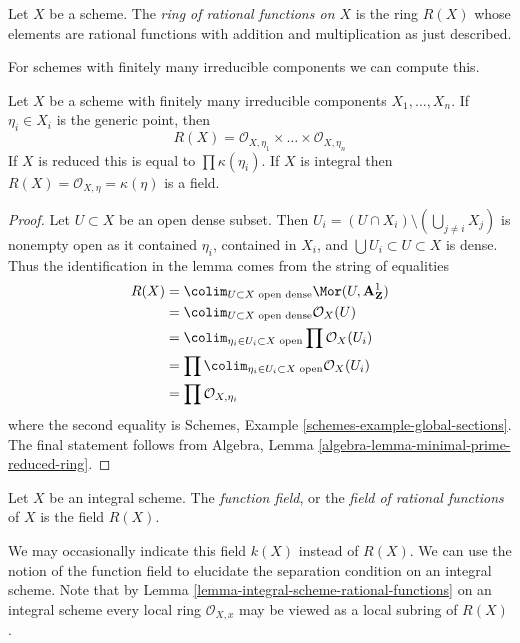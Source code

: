 \begin{definition}
\label{definition-ring-of-rational-functions}
Let $X$ be a scheme. The {\it ring of rational functions on $X$}
is the ring $R(X)$ whose elements are rational functions with
addition and multiplication as just described.
\end{definition}

\noindent
For schemes with finitely many irreducible components we can compute this.

\begin{lemma}
\label{lemma-integral-scheme-rational-functions}
Let $X$ be a scheme with finitely many irreducible components
$X_1, \ldots, X_n$. If $\eta_i \in X_i$ is the generic point, then
$$
R(X) = \mathcal{O}_{X, \eta_1} \times \ldots \times \mathcal{O}_{X, \eta_n}
$$
If $X$ is reduced this is equal to $\prod \kappa(\eta_i)$.
If $X$ is integral then $R(X) = \mathcal{O}_{X, \eta} = \kappa(\eta)$
is a field.
\end{lemma}

\begin{proof}
Let $U \subset X$ be an open dense subset. Then
$U_i = (U \cap X_i) \setminus (\bigcup_{j \not = i} X_j)$
is nonempty open as it contained $\eta_i$, contained in $X_i$,
and $\bigcup U_i \subset U \subset X$ is dense.
Thus the identification in the lemma comes from the string of equalities
\begin{align*}
R(X)
& =
\colim_{U \subset X\text{ open dense}} \Mor(U, \mathbf{A}^1_\mathbf{Z}) \\
& =
\colim_{U \subset X\text{ open dense}} \mathcal{O}_X(U) \\
& =
\colim_{\eta_i \in U_i \subset X\text{ open}} \prod \mathcal{O}_X(U_i) \\
& =
\prod \colim_{\eta_i \in U_i \subset X\text{ open}} \mathcal{O}_X(U_i) \\
& =
\prod \mathcal{O}_{X, \eta_i}
\end{align*}
where the second equality is
Schemes, Example \ref{schemes-example-global-sections}.
The final statement follows from
Algebra, Lemma \ref{algebra-lemma-minimal-prime-reduced-ring}.
\end{proof}

\begin{definition}
\label{definition-function-field}
Let $X$ be an integral scheme.
The {\it function field}, or the {\it field of rational functions}
of $X$ is the field $R(X)$.
\end{definition}

\noindent
We may occasionally indicate this field $k(X)$ instead of $R(X)$.
We can use the notion of the function field to elucidate the
separation condition on an integral scheme.
Note that by Lemma \ref{lemma-integral-scheme-rational-functions}
on an integral scheme every local ring $\mathcal{O}_{X, x}$ may be viewed
as a local subring of $R(X)$.

